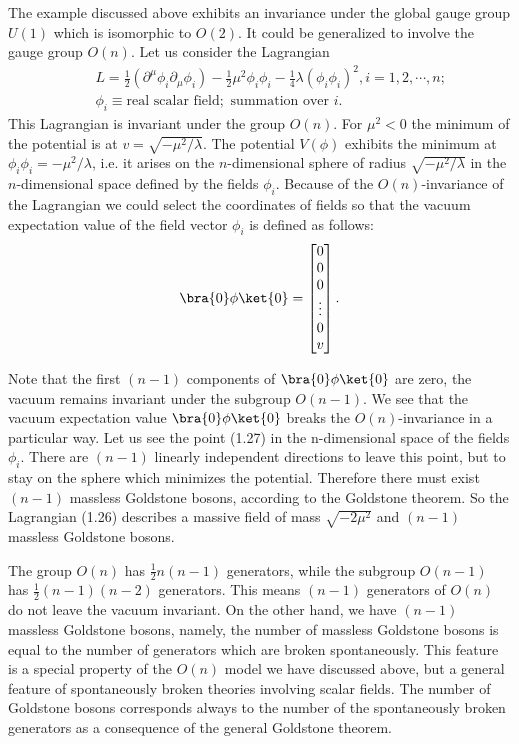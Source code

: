 The example discussed above exhibits an invariance under the global gauge group $U(1)$ which is isomorphic to $O(2)$. It could be generalized to involve the gauge group $O(n)$. Let us consider the Lagrangian
\begin{eqnarray}
&&L=\frac{1}{2}(\partial^\mu \phi_i\partial_\mu \phi_i)-\frac{1}{2}\mu^2\phi_i\phi_i-\frac{1}{4}\lambda(\phi_i\phi_i)^2, i = 1,2,\cdots,n;\nonumber\\
&& \phi_i \equiv \text{real scalar field}; \text{ summation over $i$}.
\end{eqnarray}
This Lagrangian is invariant under the group $O(n)$. For $\mu^2<0$ the minimum of the potential is at $v=\sqrt{-\mu^2/\lambda}$. The potential $V(\phi)$ exhibits the minimum at $\phi_i\phi_i=-\mu^2/\lambda$, i.e. it arises on the $n$-dimensional sphere of radius $\sqrt{-\mu^2/\lambda}$ in the $n$-dimensional space defined by the fields $\phi_i$. Because of the $O(n)$-invariance of the Lagrangian we could select the coordinates of fields so that the vacuum expectation value of the field vector $\phi_i$ is defined as follows:
\begin{equation}
\bra{0}\phi\ket{0}=
\begin{bmatrix}
0\\0\\0\\\vdots\\0\\v
\end{bmatrix}.
\end{equation}

Note that the first $(n-1)$ components of $\bra{0}\phi\ket{0}$ are zero, the vacuum remains invariant under the subgroup $O(n-1)$. We see that the vacuum expectation value $\bra{0}\phi\ket{0}$ breaks the $O(n)$-invariance in a particular way. Let us see the point (1.27) in the n-dimensional space of the fields $\phi_i$. There are $(n-1)$ linearly independent directions to leave this point, but to stay on the sphere which minimizes the potential. Therefore there must exist $(n-1)$ massless Goldstone bosons, according to the Goldstone theorem. So the Lagrangian (1.26) describes a massive field of mass $\sqrt{-2\mu^2}$ and $(n-1)$ massless Goldstone bosons.

The group $O(n)$ has $\frac{1}{2}n(n-1)$ generators, while the subgroup $O(n-1)$ has $\frac{1}{2}(n-1)(n-2)$ generators. This means $(n-1)$ generators of $O(n)$ do not leave the vacuum invariant. On the other hand, we have $(n-1)$ massless Goldstone bosons, namely, the number of massless Goldstone bosons is equal to the number of generators which are broken spontaneously. This feature is a special property of the $O(n)$ model we have discussed above, but a general feature of spontaneously broken theories involving scalar fields. The number of Goldstone bosons corresponds always to the number of the spontaneously broken generators as a consequence of the general Goldstone theorem\cite{AbersLee}.
\newpage
